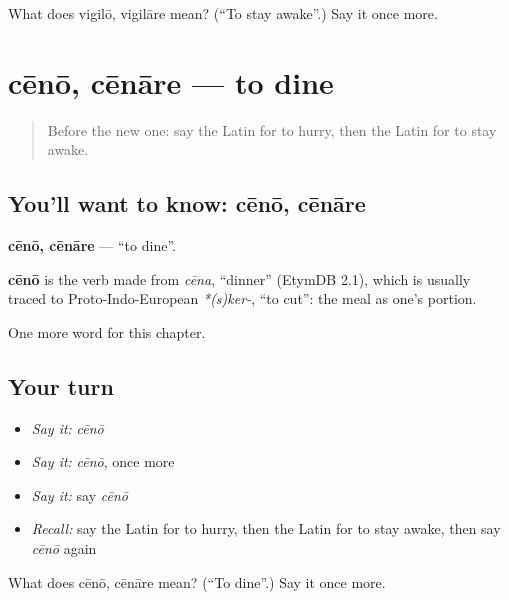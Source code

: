 \begin{tcolorbox}[breakable,colback=teal!4,colframe=teal!35!black,title={Before you move on}]
What does vigilō, vigilāre mean? (\textquotedblleft{}To stay awake\textquotedblright{}.) Say it once more.
\end{tcolorbox}
\section[cēnō, cēnāre]{cēnō, cēnāre — to dine}

\label{lesson:LA-C158-ceno}



\begin{quote}
Before the new one: say the Latin for to hurry, then the Latin for to stay awake.
\end{quote}

\subsection*{You'll want to know: cēnō, cēnāre}
\textbf{cēnō, cēnāre} — \textquotedblleft{}to dine\textquotedblright{}.

\begin{cousinweb}
\textbf{cēnō} is the verb made from \emph{cēna}, \textquotedblleft{}dinner\textquotedblright{} (EtymDB 2.1), which is usually traced to Proto-Indo-European \emph{*(s)ker-}, \textquotedblleft{}to cut\textquotedblright{}: the meal as one's portion.
\end{cousinweb}

\begin{grammarlens}[title={What you've built}]
One more word for this chapter.
\end{grammarlens}

\subsection*{Your turn}
\begin{itemize}
\raggedright
  \item \emph{Say it:} \emph{cēnō}
  \item \emph{Say it:} \emph{cēnō}, once more
  \item \emph{Say it:} say \emph{cēnō}
  \item \emph{Recall:} say the Latin for to hurry, then the Latin for to stay awake, then say \emph{cēnō} again
\end{itemize}

\begin{tcolorbox}[breakable,colback=teal!4,colframe=teal!35!black,title={Before you move on}]
What does cēnō, cēnāre mean? (\textquotedblleft{}To dine\textquotedblright{}.) Say it once more.
\end{tcolorbox}
